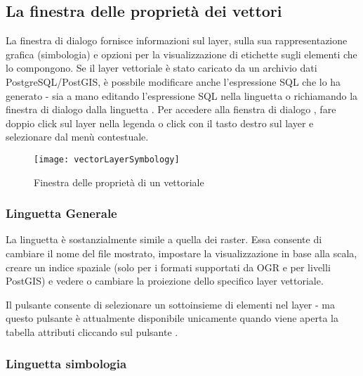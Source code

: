 \subsection{La finestra delle proprietà dei vettori}\label{sec:vectorprops}

La finestra di dialogo  fornisce informazioni
sul layer, sulla sua rappresentazione grafica (simbologia) e opzioni per la
visualizzazione di etichette sugli elementi che lo compongono. Se il layer
vettoriale è stato caricato da un archivio dati PostgreSQL/PostGIS, è possbile
modificare anche l'espressione SQL che lo ha generato - sia a mano editando
l'espressione SQL nella linguetta  o richiamando la finestra di
dialogo  dalla linguetta . 
Per accedere alla fienstra di dialogo , fare
doppio click sul layer nella legenda o click con il tasto destro  sul layer e
selezionare  dal menù contestuale.

\begin{figure}[H]
   \begin{center}
   \caption{Finestra delle proprietà di un vettoriale \nixcaption}\label{fig:vector_symbology}\smallskip
   \texttt{[image: vectorLayerSymbology]} 
\end{center}  
\end{figure}

\subsubsection{Linguetta Generale}\label{vectorgeneraltab}
La linguetta  è sostanzialmente simile a quella dei raster. Essa
consente di cambiare il nome del file mostrato, impostare la visualizzazione
in base alla scala, creare un indice spaziale (solo per i formati supportati
da OGR e per livelli PostGIS) e vedere o cambiare la proiezione dello
specifico layer vettoriale.

Il pulsante  consente di selezionare un sottoinsieme
di elementi nel layer - ma questo pulsante è attualmente disponibile
unicamente quando viene aperta la tabella attributi cliccando sul pulsante
.

\subsubsection{Linguetta simbologia}\label{sec:symbology}

